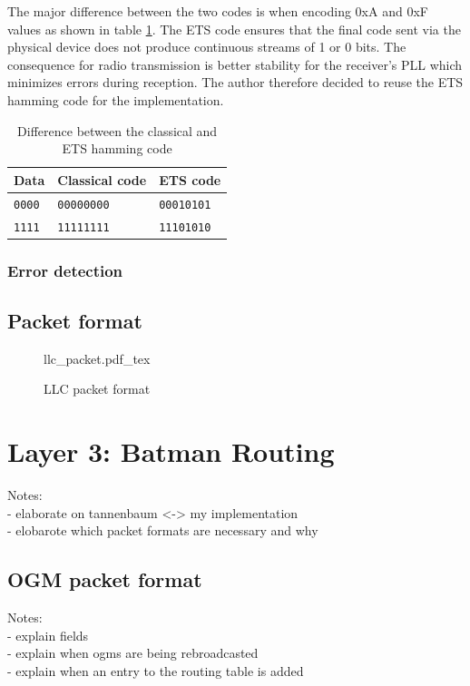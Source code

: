 The major difference between the two codes is when encoding 0xA and 0xF values as shown in table \ref{tab:hamming_diff}. The ETS code ensures that the final code sent via the physical device does not produce continuous streams of 1 or 0 bits. The consequence for radio transmission is better stability for the receiver's PLL which minimizes errors during reception. The author therefore decided to reuse the ETS hamming code for the implementation.

\begin{table}[H]
\centering
\begin{tabular}{l | l | l}
Data & Classical code & ETS code \\
\hline
\texttt{0000} & \texttt{00000000} & \texttt{00010101} \\
\texttt{1111} & \texttt{11111111} & \texttt{11101010} \\
\end{tabular}
\caption{Difference between the classical and ETS hamming code}
\label{tab:hamming_diff}
\end{table}

\subsubsection{Error detection}

\subsection{Packet format}
\begin{figure}[H]
    \centering
    {llc_packet.pdf_tex}
    \caption{LLC packet format}
\end{figure}

\section{Layer 3: Batman Routing}
Notes:\\
- elaborate on tannenbaum <-> my implementation \\
- elobarote which packet formats are necessary and why \\

\subsection{OGM packet format}
Notes:\\
- explain fields\\
- explain when ogms are being rebroadcasted\\
- explain when an entry to the routing table is added\\

